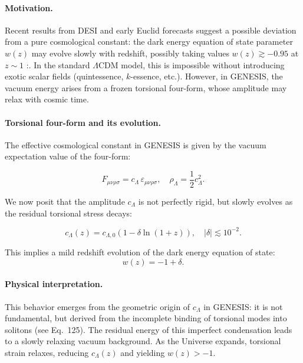 \documentclass{article}
\begin{document}
\paragraph{Motivation.}
Recent results from DESI and early Euclid forecasts suggest a possible deviation from a pure cosmological constant: the dark energy equation of state parameter $w(z)$ may evolve slowly with redshift, possibly taking values $w(z) \gtrsim -0.95$ at $z \sim 1$ :\cite{DESIwhitepaper2024, EuclidForecast2023}.
In the standard $\Lambda$CDM model, this is impossible without introducing exotic scalar fields (quintessence, $k$-essence, etc.).
However, in GENESIS, the vacuum energy arises from a frozen torsional four-form, whose amplitude may relax with cosmic time.

\paragraph{Torsional four-form and its evolution.}
The effective cosmological constant in GENESIS is given by the vacuum expectation value of the four-form:

\begin{equation}
F_{\mu\nu\rho\sigma} = c_\Lambda \, \varepsilon_{\mu\nu\rho\sigma}, \quad \rho_\Lambda = \frac{1}{2} c_\Lambda^2.
\end{equation}

We now posit that the amplitude $c_\Lambda$ is not perfectly rigid, but slowly evolves as the residual torsional stress decays:

\begin{equation}
c_\Lambda(z) = c_{\Lambda,0} \left(1 - \delta \ln(1 + z) \right), \quad |\delta| \lesssim 10^{-2}.
\end{equation}

This implies a mild redshift evolution of the dark energy equation of state:
\begin{equation}
w(z) = -1 + \delta.
\end{equation}

\paragraph{Physical interpretation.}
This behavior emerges from the geometric origin of $c_\Lambda$ in GENESIS: it is not fundamental, but derived from the incomplete binding of torsional modes into solitons (see Eq.~125).
The residual energy of this imperfect condensation leads to a slowly relaxing vacuum background.
As the Universe expands, torsional strain relaxes, reducing $c_\Lambda(z)$ and yielding $w(z) > -1$.
\end{document}
